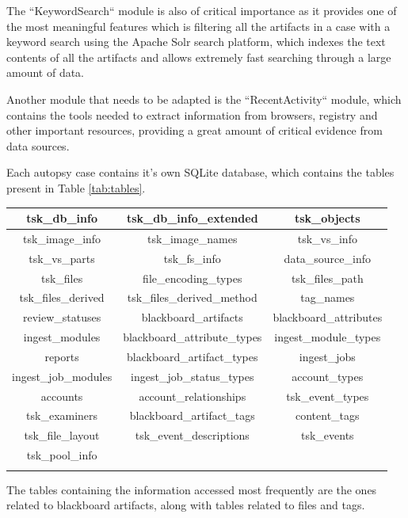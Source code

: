The ``KeywordSearch`` module is also of critical importance as it provides one of the most meaningful features which is filtering all the artifacts in a case with a keyword
search using the Apache Solr search platform, which indexes the text contents of all the artifacts and allows extremely fast searching through a large amount of data.  

Another module that needs to be adapted is the ``RecentActivity`` module, which contains the tools needed to extract information from browsers, registry and other important resources, providing a great amount of
critical evidence from data sources.

Each autopsy case contains it's own SQLite database, which contains the tables present in Table \ref{tab:tables}.

\begin{tabularx}{\textwidth}{|c|c|c|}
    \hline
    tsk\_db\_info & tsk\_db\_info\_extended & tsk\_objects \\
    \hline
    tsk\_image\_info & tsk\_image\_names & tsk\_vs\_info \\
    \hline
    tsk\_vs\_parts & tsk\_fs\_info & data\_source\_info \\
    \hline
    tsk\_files & file\_encoding\_types & tsk\_files\_path \\
    \hline
    tsk\_files\_derived & tsk\_files\_derived\_method & tag\_names \\
    \hline
    review\_statuses & blackboard\_artifacts & blackboard\_attributes \\
    \hline
    ingest\_modules & blackboard\_attribute\_types & ingest\_module\_types \\
    \hline
    reports & blackboard\_artifact\_types & ingest\_jobs \\
    \hline
    ingest\_job\_modules & ingest\_job\_status\_types & account\_types \\
    \hline
    accounts & account\_relationships & tsk\_event\_types \\
    \hline
    tsk\_examiners & blackboard\_artifact\_tags & content\_tags \\
    \hline
    tsk\_file\_layout & tsk\_event\_descriptions & tsk\_events \\
    \hline
    tsk\_pool\_info & & \\
    \hline
    \caption{Case Database Tables}
    \label{tab:tables}
\end{tabularx}

The tables containing the information accessed most frequently are the ones related to blackboard artifacts, along with tables related to files and tags.

